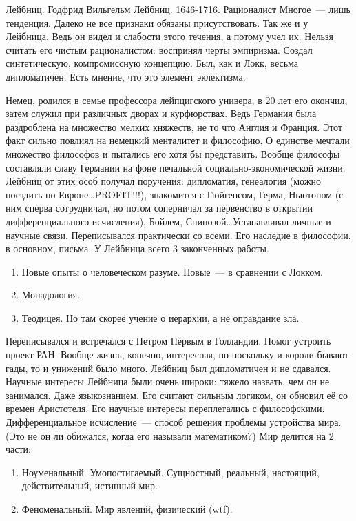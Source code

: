 Лейбниц. Годфрид Вильгельм Лейбниц. 1646-1716. Рационалист
Многое~--- лишь тенденция. Далеко не все признаки обязаны присутствовать. Так же и у Лейбница. Ведь он видел и слабости этого течения, а потому учел их. Нельзя считать его чистым рационалистом: воспринял черты эмпиризма. Создал синтетическую, компромиссную концепцию. Был, как и Локк, весьма дипломатичен. Есть мнение, что это элемент эклектизма.

Немец, родился в семье профессора лейпцигского универа, в 20 лет его окончил, затем служил при различных дворах и курфюрствах. Ведь Германия была раздроблена на множество мелких княжеств, не то что Англия и Франция. Этот факт сильно повлиял на немецкий менталитет и философию. О единстве мечтали множество философов и пытались его хотя бы представить. Вообще философы составляли славу Германии на фоне печальной социально-экономической жизни. Лейбниц от этих особ получал поручения: дипломатия, генеалогия (можно поездить по Европе\ldots PROFIT!!!), знакомится с Гюйгенсом, Герма, Ньютоном (с ним сперва сотрудничал, но потом соперничал за первенство в открытии дифференциального исчисления), Бойлем, Спинозой\ldots Устанавливал личные и научные связи. Переписывался практически со всеми. Его наследие в философии, в основном, письма. У Лейбница всего 3 законченных работы.
\begin{enumerate}
	\item Новые опыты о человеческом разуме. Новые~--- в сравнении с Локком.
	\item Монадология.
	\item Теодицея. Но там скорее учение о иерархии, а не оправдание зла.
\end{enumerate}
	
Переписывался и встречался с Петром Первым в Голландии. Помог устроить проект РАН. Вообще жизнь, конечно, интересная, но поскольку и короли бывают гады, то и унижений было много. Лейбниц был дипломатичен и не сдавался.
Научные интересы Лейбница были очень широки: тяжело назвать, чем он не занимался. Даже языкознанием. Его считают сильным логиком, он обновил её со времен Аристотеля. Его научные интересы переплетались с философскими. Дифференциальное исчисление~--- способ решения проблемы устройства мира. (Это не он ли обижался, когда его называли математиком?) 
Мир делится на 2 части: 
\begin{enumerate}
	\item Ноуменальный. Умопостигаемый. Сущностный, реальный, настоящий, действительный, истинный мир.
	\item Феноменальный. Мир явлений, физический (wtf). 
\end{enumerate}

